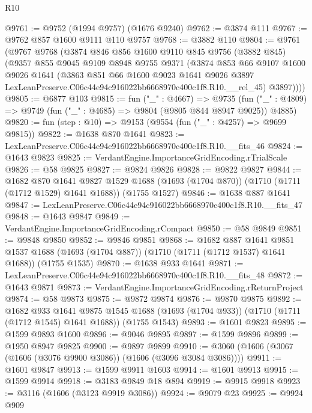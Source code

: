 \begin{lexlean}{R10}
\begin{coremodule}
@9761 := @9752 (@1994 @9757) (@1676 @9240)
@9762 := @3874 @111
@9767 := @9762 @857 @1600 @9111 @110 @9757
@9768 := @3882 @110
@9804 := @9761
    (@9767
      @9768
      (@3874
        @846
        @856
        @1600
        @9110
        @845
        @9756
        (@3882 @845)
        (@9357
          @855
          @9045
          @9109
          @8948
          @9755
          @9371
          (@3874
            @853
            @66
            @9107
            @1600
            @9026
            @1641
            (@3863
              @851
              @66
              @1600
              @9023
              @1641
              @9026
              @3897
              LexLeanPreserve.C06c44e94c916022bb6668970c400c1f8.R10.__rel_45)
            @3897))))
@9805 := @6877 @103
@9815 := fun ("_" : @4667) =>
  @9735 (fun ("_" : @4809) => @9749 (fun ("_" : @4685) => @9804 (@9805 @844 @8947 @9025)) @4885)
@9820 := fun (step : @10) => @9153 (@9554 (fun ("_" : @4257) => @9699 @9815))
@9822 := @1638 @870 @1641
@9823 := LexLeanPreserve.C06c44e94c916022bb6668970c400c1f8.R10.__fits_46
@9824 := @1643 @9823
@9825 := VerdantEngine.ImportanceGridEncoding.rTrialScale
@9826 := @58 @9825
@9827 := @9824 @9826
@9828 := @9822 @9827
@9844 := @1682
    @870
    @1641
    @9827
    @1529
    @1688
    (@1693 (@1704 @870))
    (@1710 (@1711 (@1712 @1529) @1641 @1688))
    (@1755 @1527)
@9846 := @1638 @887 @1641
@9847 := LexLeanPreserve.C06c44e94c916022bb6668970c400c1f8.R10.__fits_47
@9848 := @1643 @9847
@9849 := VerdantEngine.ImportanceGridEncoding.rCompact
@9850 := @58 @9849
@9851 := @9848 @9850
@9852 := @9846 @9851
@9868 := @1682
    @887
    @1641
    @9851
    @1537
    @1688
    (@1693 (@1704 @887))
    (@1710 (@1711 (@1712 @1537) @1641 @1688))
    (@1755 @1535)
@9870 := @1638 @933 @1641
@9871 := LexLeanPreserve.C06c44e94c916022bb6668970c400c1f8.R10.__fits_48
@9872 := @1643 @9871
@9873 := VerdantEngine.ImportanceGridEncoding.rReturnProject
@9874 := @58 @9873
@9875 := @9872 @9874
@9876 := @9870 @9875
@9892 := @1682
    @933
    @1641
    @9875
    @1545
    @1688
    (@1693 (@1704 @933))
    (@1710 (@1711 (@1712 @1545) @1641 @1688))
    (@1755 @1543)
@9893 := @1601 @9823
@9895 := @1599 @9893 @1600
@9896 := @9046 @9895
@9897 := @1599 @9896
@9899 := @1950 @8947 @9825
@9900 := @9897 @9899
@9910 := @3060 (@1606 (@3067 (@1606 (@3076 @9900 @3086)) (@1606 (@3096 @3084 @3086))))
@9911 := @1601 @9847
@9913 := @1599 @9911 @1603
@9914 := @1601 @9913
@9915 := @1599 @9914
@9918 := @3183 @9849 @18 @894
@9919 := @9915 @9918
@9923 := @3116 (@1606 (@3123 @9919 @3086))
@9924 := @9079 @23
@9925 := @9924 @909

\end{coremodule}
\end{lexlean}
